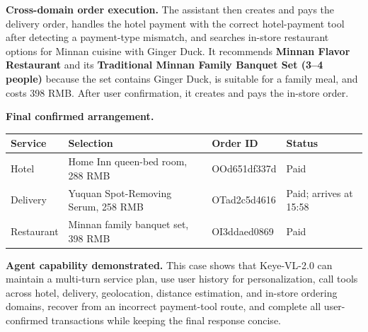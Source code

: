\begin{caseresponse}
\textbf{Cross-domain order execution.} The assistant then creates and pays the delivery order, handles the hotel payment with the correct hotel-payment tool after detecting a payment-type mismatch, and searches in-store restaurant options for Minnan cuisine with Ginger Duck. It recommends \textbf{Minnan Flavor Restaurant} and its \textbf{Traditional Minnan Family Banquet Set (3--4 people)} because the set contains Ginger Duck, is suitable for a family meal, and costs 398 RMB. After user confirmation, it creates and pays the in-store order.

\textbf{Final confirmed arrangement.}
\begin{center}
\begin{tabular}{llll}
\toprule
\textbf{Service} & \textbf{Selection} & \textbf{Order ID} & \textbf{Status} \\
\midrule
Hotel & Home Inn queen-bed room, 288 RMB & OOd651df337d & Paid \\
Delivery & Yuquan Spot-Removing Serum, 258 RMB & OTad2c5d4616 & Paid; arrives at 15:58 \\
Restaurant & Minnan family banquet set, 398 RMB & OI3ddaed0869 & Paid \\
\bottomrule
\end{tabular}
\end{center}

\textbf{Agent capability demonstrated.} This case shows that Keye-VL-2.0 can maintain a multi-turn service plan, use user history for personalization, call tools across hotel, delivery, geolocation, distance estimation, and in-store ordering domains, recover from an incorrect payment-tool route, and complete all user-confirmed transactions while keeping the final response concise.
\end{caseresponse}

\label{fig:multi_domain_service_agent_case}

\clearpage
